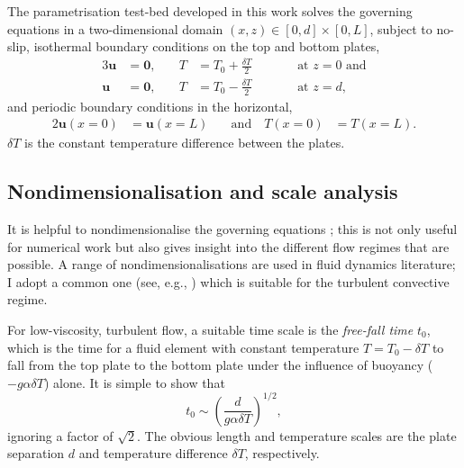 \documentclass[titlepage]{article}
\numberwithin{equation}{section}
\renewcommand\vec{\bm}
\begin{document}
The parametrisation test-bed developed in this work solves the governing
equations in a two-dimensional domain $(x,z) \in [0, d] \times [0, L]$, subject
to no-slip, isothermal boundary conditions on the top and bottom plates,
\begin{alignat}{3}
    \label{eqn:dim_bc_bot}
    \vec{u} &= \vec{0}, &\quad T &= T_0 + \frac{\delta T}{2}
    &\qquad& \text{at } z = 0 \text{ and} \\
    \label{eqn:dim_bc_top}
    \vec{u} &= \vec{0}, &\quad T &= T_0 - \frac{\delta T}{2}
    &\qquad& \text{at } z = d,
\end{alignat}
and periodic boundary conditions in the horizontal,
\begin{alignat}{2}
    \label{eqn:dim_bc_sides}
    \vec{u}(x=0) &= \vec{u}(x=L) &\quad \text{and} \quad T(x=0) &= T(x=L).
\end{alignat}
$\delta T$ is the constant temperature difference between the plates.

\subsection{Nondimensionalisation and scale analysis}
It is helpful to nondimensionalise the governing equations
; this is not only useful
for numerical work but also gives insight into the different flow
regimes that are possible. A range of nondimensionalisations are used in
fluid dynamics literature; I adopt a common one (see, e.g.,
\textcite{grotzbach1983,ouertatani2008,stevens2010}) which is suitable
for the turbulent convective regime.

For low-viscosity, turbulent flow, a suitable time scale is the
\emph{free-fall time} $t_0$, which is the time for a fluid element with
constant temperature $T = T_0 - \delta T$ to fall from the top plate to
the bottom plate under the influence of buoyancy ($-g \alpha \delta T$)
alone. It is simple to show that
\[
    t_0 \sim \left( \frac{d}{g \alpha \delta T} \right)^{1/2},
\]
ignoring a factor of $\sqrt{2}$. The obvious length and temperature
scales are the plate separation $d$ and temperature difference $\delta T$,
respectively.
\end{document}
